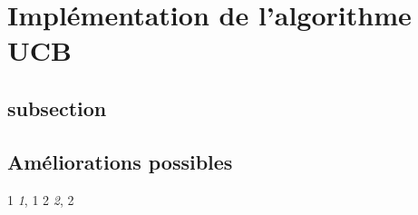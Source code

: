 \documentclass[a4paper]{article}
\theoremstyle{definition}
\begin{document}
\clearpage

\section{Implémentation de l'algorithme UCB}

\subsection{subsection}

\subsection{Améliorations possibles}

\clearpage
%
\begin{thebibliography}{9}

1 {\em 1}, 1
2 {\em 2}, 2

\end{thebibliography}
\end{document}
